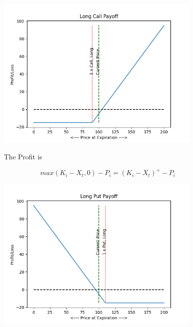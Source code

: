 \begin{appendix}
\begin{figure}[!htb]
\begin{minipage}{0.4\linewidth}
    \end{minipage}
    \begin{minipage}{0.65\linewidth}
        \centering
        \includegraphics[width=10cm]{Graphs/LongCallEx.png}
        \caption{}
        \label{fig:LC}
    \end{minipage}
\end{figure}

\begin{figure}[!h]
    \begin{minipage}{0.4\linewidth}

        The Profit is

        \[max(K_{i} - X_{t}, 0) - P_{i} = (K_{i} - X_{t})^{+} - P_{i}\]

    \end{minipage}
    \begin{minipage}{0.65\linewidth}
        \centering
        \includegraphics[width=10cm]{Graphs/LongPutEx.png}
        \caption{}
        \label{fig:LP}
    \end{minipage}
\end{figure}
\clearpage

\end{appendix}
